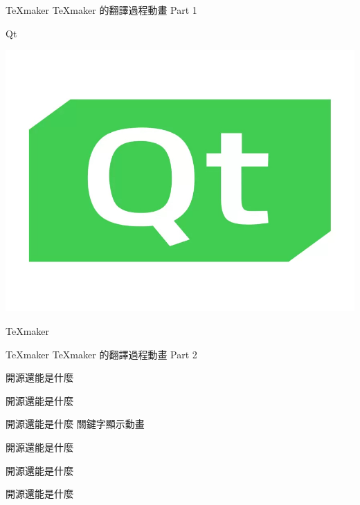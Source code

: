 \newpage
\begin{mainpage}{3}{TeXmaker}
TeXmaker 的翻譯過程動畫 Part 1
\end{mainpage}
\newpage
\begin{mainpage}{3}{Qt}
\begin{center}
\includegraphics[width = 90 mm]{動畫測試/qt.jpeg}
\end{center}
\end{mainpage}
\newpage
\begin{mainpage}{3}{TeXmaker}
\end{mainpage}
\newpage
\begin{mainpage}{3}{TeXmaker}
TeXmaker 的翻譯過程動畫 Part 2
\end{mainpage}
\newpage
{}
\newpage
{}
\newpage
%
%
\begin{mainpage}{4}{開源還能是什麼}
\end{mainpage}
\newpage
\begin{mainpage}{4}{開源還能是什麼}
\end{mainpage}
\newpage
\begin{mainpage}{4}{開源還能是什麼}
關鍵字顯示動畫
\end{mainpage}
\newpage
\begin{mainpage}{4}{開源還能是什麼}
\end{mainpage}
\newpage
\begin{mainpage}{4}{開源還能是什麼}
\end{mainpage}
\newpage
\begin{mainpage}{4}{開源還能是什麼}
\end{mainpage}
\newpage
%
%
\newpage



